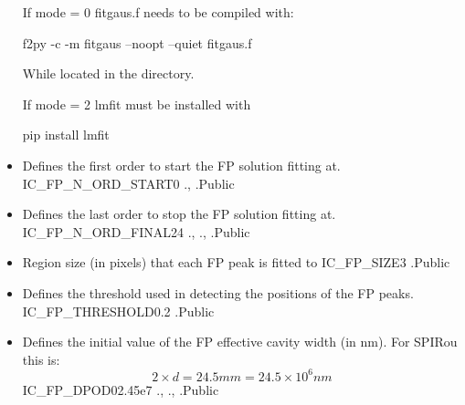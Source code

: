 \begin{itemize}
\begin{minipage}[t]{\textwidth}
\ifdevguide
\begin{note}
If mode = 0 fitgaus.f needs to be compiled with:
\begin{cmdbox}
f2py -c -m fitgaus --noopt --quiet fitgaus.f
\end{cmdbox}
While located in the  directory.
\end{note}

\begin{note}
If mode = 2 lmfit must be installed with
\begin{cmdbox}
pip install lmfit
\end{cmdbox}
\end{note}
\fi
\end{minipage}


\item {} 
{Defines the first order to start the FP solution fitting at.}
{IC\_FP\_N\_ORD\_START}{0}
{\calWAVE}{\constantsfile}{\spirouWAVE., \spirouWAVE.}{Public}

\item {} 
{Defines the last order to stop the FP solution fitting at.}
{IC\_FP\_N\_ORD\_FINAL}{24}
{\calWAVE}{\constantsfile}{\spirouWAVE., \spirouWAVE., \spirouPlot.}{Public}

\item {} 
{Region size (in pixels) that each FP peak is fitted to}
{IC\_FP\_SIZE}{3}
{\calWAVE}{\constantsfile}{\spirouWAVE.}{Public}

\item {} 
{Defines the threshold used in detecting the positions of the FP peaks.}
{IC\_FP\_THRESHOLD}{0.2}
{\calWAVE}{\constantsfile}{\spirouWAVE.}{Public}

\item {} 
{Defines the initial value of the FP effective cavity width (in nm). For SPIRou this is: 
\begin{equation}
2 \times d = 24.5 mm = 24.5\times10^{6} nm
\end{equation}
}
{IC\_FP\_DPOD0}{2.45e7}
{\calWAVE}{\constantsfile}{\spirouWAVE., \spirouWAVE., \spirouWAVE.}{Public}


\end{itemize}
